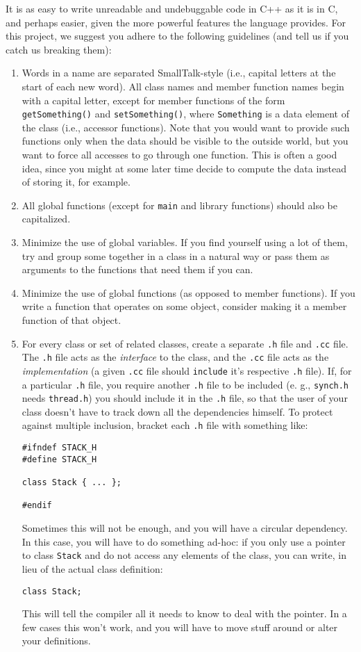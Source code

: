 It is as easy to write unreadable and undebuggable code in C++ as it
is in C, and perhaps easier, given the more powerful features the
language provides.  For this project, we suggest you adhere to the
following guidelines (and tell us if you catch us breaking them):

\begin{enumerate}
\item Words in a name are separated SmallTalk-style (i.e., capital
letters at the start of each new word).  All class names and member
function names begin with a capital letter, except for member
functions of the form {\tt getSomething()} and {\tt setSomething()},
where {\tt Something} is a data element of the class (i.e., accessor
functions).  Note that you would want to provide such functions only
when the data should be visible to the outside world, but you want to
force all accesses to go through one function.  This is often a good
idea, since you might at some later time decide to compute the data
instead of storing it, for example.
\item All global functions (except for {\tt main} and library
functions) should also be capitalized.
\item Minimize the use of global variables.  If you find yourself
using a lot of them, try and group some together in a class in a
natural way or pass them as arguments to the functions that need them
if you can.
\item Minimize the use of global functions (as opposed to member
functions).  If you write a function that operates on some object,
consider making it a member function of that object.
\item For every class or set of related classes, create a separate
{\tt .h} file and {\tt .cc} file. The {\tt .h} file acts as the {\it
interface} to the class, and the {\tt .cc} file acts as the
{\it implementation} (a given {\tt .cc} file should {\tt include} it's
respective {\tt .h} file).  If, for a particular {\tt .h} file, you require
another {\tt .h} file to be included (e. g., {\tt synch.h} needs
{\tt thread.h}) you should include it in the {\tt .h} file, so that
the user of your class doesn't have to track down all the dependencies
himself.  To protect against multiple inclusion, bracket each {\tt .h}
file with something like:
\begin{verbatim}
#ifndef STACK_H
#define STACK_H

class Stack { ... };

#endif
\end{verbatim}
Sometimes this will not be enough, and you will have a circular
dependency.  In this case, you will have to do something ad-hoc: if
you only use a pointer to class {\tt Stack} and do not access any
elements of the class, you can write, in lieu of the actual class
definition:
\begin{verbatim}
class Stack;
\end{verbatim}
This will tell the compiler all it
needs to know to deal with the pointer.  In a few cases this won't work,
and you will have to move stuff around or alter your definitions.

\end{enumerate}

